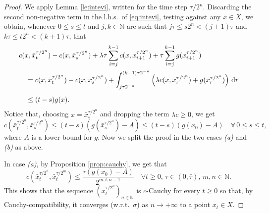 \documentclass[reqno]{amsart}
\theoremstyle{plain}
\theoremstyle{remark}
\theoremstyle{plain}
\numberwithin{equation}{section}
\theoremstyle{remark}
\newcommand{\N}{\mathbb{N}}
\newcommand{\de}{{\,\rm d}}
\begin{document}
\begin{proof} We apply Lemma \ref{le:intevi}, written for  the time step  $\tau/2^n$. Discarding the second non-negative term in the  l.h.s.\ of \eqref{eq:intevi},  testing against any $x \in X$, we obtain, whenever $0 \le s \le t$ and $j,k \in \N$ are such that $j\tau \le s 2^n < (j+1)\tau$ and $k\tau \le t 2^n < (k+1)\tau$, that
\begin{align}\nonumber
&c(x,\bar{x}^{\tau/{2^n}}_t)-c(x,\bar{x}^{\tau/{2^n}}_s)  + \lambda \tau \sum_{i=j}^{k-1}c(x,x_{i+1}^{\tau/2^n}) + \tau \sum_{i=j}^{k-1} g(x_{i+1}^{\tau/2^n})\\ \nonumber 
    &\quad =c(x,\bar{x}^{\tau/{2^n}}_t)-c(x,\bar{x}^{\tau/{2^n}}_s)  + \int_{j\tau 2^{-n}}^{(k-1)\tau 2^{-n}} \left (\lambda c(x,\bar{x}^{\tau/2^n}_r) + g(\bar{x}^{\tau/2^n}_r) \right ) \de r \\[2mm] \label {eq:discevie3}
    &\quad \le (t-s) g(x).  
\end{align}
Notice that, choosing $x=\bar{x}^{\tau/2^n}_s$ and dropping the term $\lambda c\ge 0$, we get
\begin{equation}\label{eq:cocont}
c(\bar{x}^{\tau/2^n}_t, \bar{x}^{\tau/2^n}_s) \le (t-s)(g(\bar{x}^{\tau/2^n}_s)-A) \le (t-s)(g(x_0)-A) \quad \forall \, 0 \le s \le t, 
\end{equation}
where $A$ is a lower bound for $g$.
Now we split the proof in the two cases {\it (a)} and {\it (b)} as above.

In case {\it (a)}, by Proposition \ref{prop:cauchy}, we get that
    \begin{equation}\label{eq:mminn}
    c \left (\bar{x}^{\tau/{2^n}}_t, \bar{x}^{\tau/{2^m}}_t \right ) \le \frac{\tau (g(x_0)-A)}{2^{ m \wedge n-1}} \quad \forall t \ge 0, \, \tau \in (0, \bar{\tau}), \, m,n \in \N.
    \end{equation}
    This shows that the sequence $(\bar{x}^{\tau/{2^n}}_t)_{n \in \N}$ is $c$-Cauchy for every 
    $t\ge 0$ so that, by Cauchy-compatibility, it converges (w.r.t.~$\sigma$) as $n \to + \infty$ to a point $x_t \in X$. 


\end{proof}
\end{document}
